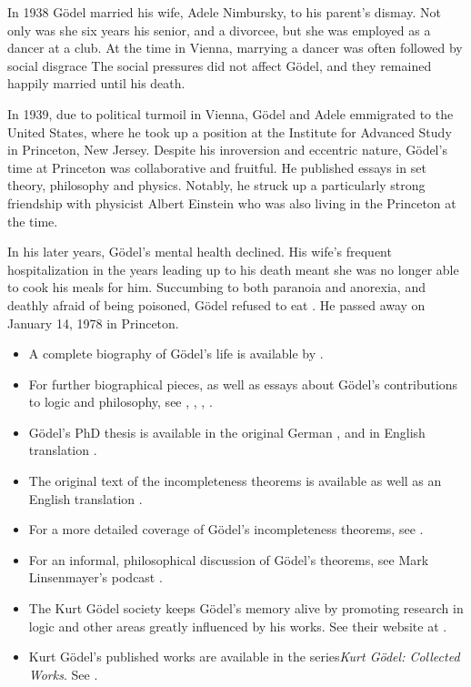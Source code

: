 \documentclass[../../../include/open-logic-section]{subfiles}
\begin{document}
In 1938 G{\"o}del married his wife, Adele Nimbursky, to his parent's dismay. Not
only was she six years his senior, and a divorcee, but she was employed as
a dancer at a club. At the time in Vienna, marrying a dancer was often
followed by social disgrace \citep[34]{Dawson1997} The social pressures did not
affect G{\"o}del, and they remained happily married until his death.

In 1939, due to political turmoil in Vienna, G{\"o}del and Adele emmigrated to
the United States, where he took up a position at the Institute for
Advanced Study in Princeton, New Jersey. Despite his inroversion and
eccentric nature, G{\"o}del's time at Princeton was collaborative and fruitful.
He published essays in set theory, philosophy and physics. Notably, he
struck up a particularly strong friendship with physicist Albert Einstein
who was also living in the Princeton at the time.

In his later years, G{\"o}del's mental health declined. His wife's frequent
hospitalization in the years leading up to his death meant she was no
longer able to cook his meals for him. Succumbing to both paranoia and
anorexia, and deathly afraid of being poisoned, G{\"o}del refused to eat
\citep[251]{Dawson1997}. He passed away on January 14, 1978 in Princeton.

\begin{reading}
\begin{itemize} 
\item A complete biography of G{\"o}del's life is available
by \citet{Dawson1997}. 

\item For further biographical pieces, as well as
essays about G{\"o}del's contributions to logic and philosophy, see
\citet{Wang1990}, \citet{Baaz2011}, \citet{Takeuti2003}, \citet{Sigmund2007}.

\item G{\"o}del's PhD thesis is available in the original German
\citep{Godel1929}, and in English translation \citep{Godel1986}. 

\item The original text of the incompleteness theorems is available 
\citep{Godel1931} as well as an English translation \citep{Godel1986}. 

\item For a more detailed coverage of G{\"o}del's incompleteness theorems,
 see \citet{Smith2013}. 
 
 \item For an informal, philosophical discussion of G{\"o}del's theorems, 
 see Mark Linsenmayer's podcast \citep{Linsenmayer2014}. 

\item The Kurt G{\"o}del society keeps G{\"o}del's
memory alive by promoting research in logic and other areas greatly
influenced by his works. See their website at \citet{Society2015}.

\item Kurt G{\"o}del's published works are available in the series\emph{Kurt G{\"o}del: 
Collected Works}. See \citet{Godel1986,Godel1990}.

\end{itemize}
\end{reading}
\end{document}
